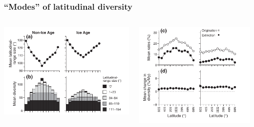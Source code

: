 \documentclass{beamer}
\begin{document}
\begin{frame}
  \frametitle{``Modes'' of latitudinal diversity}
  \begin{columns}
    \begin{column}{0.55\textwidth}
      \includegraphics[width=\textwidth,height=0.8\textheight,keepaspectratio=true]{figure/powell_2007_a}
    \end{column}
    \begin{column}{0.5\textwidth}
      \includegraphics[width=\textwidth,height=0.8\textheight,keepaspectratio=true]{figure/powell_2007_b}
    \end{column}
  \end{columns}

\end{frame}
\end{document}
